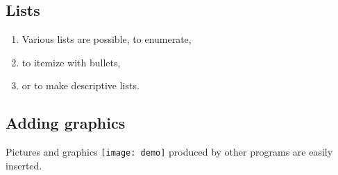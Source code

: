 \documentclass[a4paper,12pt]{article}
\begin{document}
\subsection{Lists}

\begin{enumerate}
	\item Various lists are possible, to enumerate,
	\item to itemize with bullets,
	\item or to make descriptive lists.
\end{enumerate}

\subsection{Adding graphics}

Pictures and graphics
\texttt{[image: demo]}
produced by other programs are easily inserted.
\end{document}
